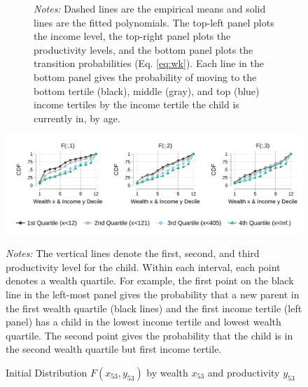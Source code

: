 \documentclass[12pt]{article}
\begin{document}
\begin{figure}
\begin{subfigure}{\textwidth}
		{\begin{footnotesize}\textit{Notes:}
			Dashed lines are the empirical means and solid lines are the fitted polynomials. The top-left panel plots the income level, the top-right panel plots the productivity levels, and the bottom panel plots the transition probabilities (Eq. \ref{eq:wk}). Each line in the bottom panel gives the probability of moving to the bottom tertile (black), middle (gray), and top (blue) income tertiles by the income tertile the child is currently in, by age. \end{footnotesize}\vspace{0.05in}}
	\end{subfigure}
\end{figure}

\begin{figure}\caption{Initial Distribution $F(x_{53},y_{53})$ by wealth $x_{53}$ and productivity $y_{53}$}\label{fig:inidistr}
		\includegraphics[width=1\textwidth]{../tabfig/empirical/inidistr}
		{\begin{footnotesize}\textit{Notes:} The vertical lines denote the first, second, and third productivity level for the child. Within each interval, each point denotes a wealth quartile. For example, the first point on the black line in the left-most panel gives the probability that a new parent in the first wealth quartile (black lines) and the first income tertile (left panel) has a child in the lowest income tertile and lowest wealth quartile. The second point gives the probability that the child is in the second wealth quartile but first income tertile. \end{footnotesize}}
\end{figure}
\end{document}
